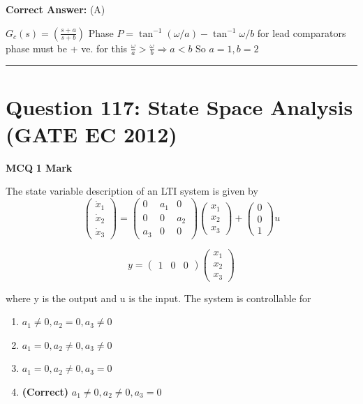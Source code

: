 \documentclass[11pt,a4paper]{article}
\begin{document}
\noindent \textbf{Correct Answer:} (A)

\begin{tcolorbox}[solbox, title=Detailed Solution -- Question 116]
$G_{c}(s)=\left(\frac{s+a}{s+b}\right)$
 Phase $P=\tan ^{-1}(\omega / a)-\tan ^{-1} \omega / b$
 for lead comparators phase must be + ve.
 for this $\frac{\omega}{a} > \frac{\omega}{b} \Rightarrow a < b$
 So $a=1, b=2$
\end{tcolorbox}

\vspace{1.5em}
\hrule
\vspace{1.5em}

\section*{Question 117: State Space Analysis (GATE EC 2012)}
\noindent \textbf{\color{primary}MCQ} \hfill \textbf{\color{secondary}1 Mark}


\noindent The state variable description of an LTI system is given by 
\[
\begin{pmatrix} \dot{x}_{1}\\ \dot{x}_{2}\\ \dot{x}_{3} \end{pmatrix}=\begin{pmatrix} 0 & a_{1}& 0\\ 0& 0 & a_{2}\\ a_{3} & 0 & 0 \end{pmatrix}\begin{pmatrix} x_{1}\\ x_{2}\\ x_{3} \end{pmatrix}+\begin{pmatrix} 0\\ 0\\ 1 \end{pmatrix}u
\]
 

\[
y=\begin{pmatrix} 1 &0 &0 \end{pmatrix}\begin{pmatrix} x_{1}\\ x_{2}\\ x_{3} \end{pmatrix}
\]
 
 where y is the output and u is the input. The system is controllable for


\begin{enumerate}[label=(\Alph*)]
    \item $a_{1}\neq 0, a_{2}=0,a_{3} \neq 0$
    \item $a_{1}= 0, a_{2}\neq 0,a_{3} \neq 0$
    \item $a_{1}= 0, a_{2}\neq 0,a_{3} = 0$
    \item \textbf{(Correct)} $a_{1}\neq 0, a_{2}\neq 0,a_{3} = 0$
\end{enumerate}
\end{document}
